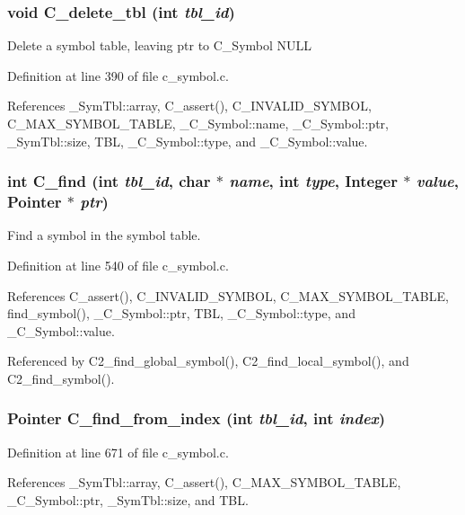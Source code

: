 \subsubsection{\setlength{\rightskip}{0pt plus 5cm}void C\_\-delete\_\-tbl (int {\em tbl\_\-id})}\label{c__symbol_8h_90b255ee5e4782d9fe4d241b3b5c4379}


Delete a symbol table, leaving ptr to C\_\-Symbol NULL 

Definition at line 390 of file c\_\-symbol.c.

References \_\-Sym\-Tbl::array, C\_\-assert(), C\_\-INVALID\_\-SYMBOL, C\_\-MAX\_\-SYMBOL\_\-TABLE, \_\-C\_\-Symbol::name, \_\-C\_\-Symbol::ptr, \_\-Sym\-Tbl::size, TBL, \_\-C\_\-Symbol::type, and \_\-C\_\-Symbol::value.
\subsubsection{\setlength{\rightskip}{0pt plus 5cm}int C\_\-find (int {\em tbl\_\-id}, char $\ast$ {\em name}, int {\em type}, \bf{Integer} $\ast$ {\em value}, \bf{Pointer} $\ast$ {\em ptr})}\label{c__symbol_8h_25fbe8c538d064e4a59ec2fb2598a1d5}


Find a symbol in the symbol table. 

Definition at line 540 of file c\_\-symbol.c.

References C\_\-assert(), C\_\-INVALID\_\-SYMBOL, C\_\-MAX\_\-SYMBOL\_\-TABLE, find\_\-symbol(), \_\-C\_\-Symbol::ptr, TBL, \_\-C\_\-Symbol::type, and \_\-C\_\-Symbol::value.

Referenced by C2\_\-find\_\-global\_\-symbol(), C2\_\-find\_\-local\_\-symbol(), and C2\_\-find\_\-symbol().
\subsubsection{\setlength{\rightskip}{0pt plus 5cm}\bf{Pointer} C\_\-find\_\-from\_\-index (int {\em tbl\_\-id}, int {\em index})}\label{c__symbol_8h_3b66fec0ccf9115ed3cfa0bf166c6344}




Definition at line 671 of file c\_\-symbol.c.

References \_\-Sym\-Tbl::array, C\_\-assert(), C\_\-MAX\_\-SYMBOL\_\-TABLE, \_\-C\_\-Symbol::ptr, \_\-Sym\-Tbl::size, and TBL.
